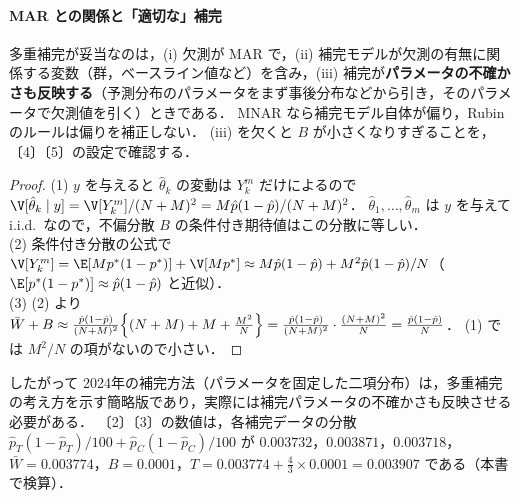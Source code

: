 \paragraph{MAR との関係と「適切な」補完}
多重補完が妥当なのは，(i) 欠測が MAR で，(ii) 補完モデルが欠測の有無に関係する変数（群，ベースライン値など）を含み，(iii) 補完が\textbf{パラメータの不確かさも反映する}（予測分布のパラメータをまず事後分布などから引き，そのパラメータで欠測値を引く）ときである．
MNAR なら補完モデル自体が偏り，Rubin のルールは偏りを補正しない．
(iii) を欠くと $B$ が小さくなりすぎることを，〔4〕〔5〕の設定で確認する．
\begin{proof}
(1) $y$ を与えると $\hat\theta_k$ の変動は $Y_k^m$ だけによるので $\V[\hat\theta_k\mid y]=\V[Y_k^m]/(N+M)^2=M\hat p(1-\hat p)/(N+M)^2$．
$\hat\theta_1,\dots,\hat\theta_m$ は $y$ を与えて i.i.d.\ なので，不偏分散 $B$ の条件付き期待値はこの分散に等しい．\\
(2) 条件付き分散の公式で $\V[Y_k^m]=\E[Mp^*(1-p^*)]+\V[Mp^*]\approx M\hat p(1-\hat p)+M^2\hat p(1-\hat p)/N$（$\E[p^*(1-p^*)]\approx\hat p(1-\hat p)$ と近似）．\\
(3) (2) より $\bar W+B\approx\frac{\hat p(1-\hat p)}{(N+M)^2}\Bigl\{(N+M)+M+\frac{M^2}N\Bigr\}=\frac{\hat p(1-\hat p)}{(N+M)^2}\cdot\frac{(N+M)^2}{N}=\frac{\hat p(1-\hat p)}{N}$．
(1) では $M^2/N$ の項がないので小さい．
\end{proof}
したがって 2024年の補完方法（パラメータを固定した二項分布）は，多重補完の考え方を示す簡略版であり，実際には補完パラメータの不確かさも反映させる必要がある．
〔2〕〔3〕の数値は，各補完データの分散 $\hat p_T(1-\hat p_T)/100+\hat p_C(1-\hat p_C)/100$ が $0.003732$，$0.003871$，$0.003718$，
$\bar W=0.003774$，$B=0.0001$，$T=0.003774+\frac43\times0.0001=0.003907$ である（本書で検算）．

